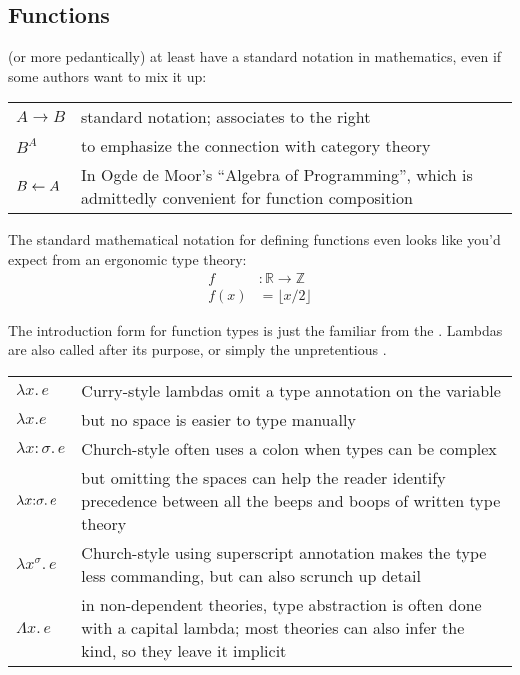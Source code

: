 \documentclass[11pt]{article} %
\theoremstyle{definition}
\theoremstyle{remark}
\begin{document}
\subsection{Functions}
\label{subsec:function-types}

 (or  more pedantically) at least have a standard notation in mathematics, even if some authors want to mix it up:
\begin{center}
\renewcommand{\arraystretch}{1.2}
\begin{tabular}{lp{10cm}}
$A \to B$ & standard notation; associates to the right \\
$B^A$ & to emphasize the connection with category theory \\
$B \leftarrow A$ & In Ogde de Moor's ``Algebra of Programming'', which is admittedly convenient for function composition \\
\end{tabular}
\end{center}
The standard mathematical notation for defining functions even looks like you'd expect from an ergonomic type theory:
\begin{align*}
f &: \mathbb R \to \mathbb Z \\
f(x) &= \lfloor x/2 \rfloor
\end{align*}

The introduction form for function types is just the familiar  from the \lambdaCalculus{}. Lambdas are also called  after its purpose, or simply the unpretentious .
\begin{center}
\renewcommand{\arraystretch}{1.2}
\begin{tabular}{lp{10cm}}
$\lambda x.\,e$ & Curry-style lambdas omit a type annotation on the variable \\
$\lambda x.e$ & but no space is easier to type manually \\
$\lambda x:\sigma.\,e$ & Church-style often uses a colon when types can be complex \\
$\lambda x\mathord:\sigma.\,e$
  & but omitting the spaces can help the reader identify precedence between all the beeps and boops of written type theory \\
$\lambda x^\sigma.\,e$
  & Church-style using superscript annotation makes the type less commanding, but can also scrunch up detail \\
$\Lambda x.\,e$
  & in non-dependent theories, type abstraction is often done with a capital lambda; most theories can also infer the kind, so they leave it implicit \\
\end{tabular}
\end{center}
\end{document}
